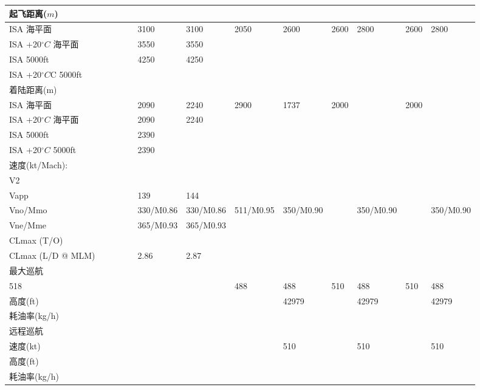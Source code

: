 \documentclass[12pt,a4paper]{report}
\begin{document}
\begin{landscape}
\begin{center}
\begin{longtable}{|p{1.5cm}|p{1.3cm}|p{1.1cm}|p{1.1cm}|p{1.1cm}|p{1.1cm}|p{1.1cm}|p{1.1cm}|p{1.1cm}|p{1.1cm}|p{1.1cm}|p{1.1cm}|p{1.1cm}|}
起飞距离($m$)	&		&		&		&		&		&		&		&		&		&		&		&		\\ \hline
ISA 海平面	&		&		&		&		&	3100	&	3100	&	2050	&	2600	&	2600	&	2800	&	2600	&	2800	\\ \hline
ISA +20$^\circ C$ 海平面	&		&		&		&		&	3550	&	3550	&		&		&		&		&		&		\\ \hline
ISA 5000ft	&		&		&		&		&	4250	&	4250	&		&		&		&		&		&		\\ \hline
ISA +20$^\circ C$C 5000ft	&		&		&		&		&		&		&		&		&		&		&		&		\\ \hline
着陆距离(m)	&		&		&		&		&		&		&		&		&		&		&		&		\\ \hline
ISA 海平面	&		&		&		&		&	2090	&	2240	&	2900	&	1737	&	2000	&		&	2000	&		\\ \hline
ISA +20$^\circ C$ 海平面	&		&		&		&		&	2090	&	2240	&		&		&		&		&		&		\\ \hline
ISA 5000ft	&		&		&		&		&	2390	&		&		&		&		&		&		&		\\ \hline
ISA +20$^\circ C$ 5000ft	&		&		&		&		&	2390	&		&		&		&		&		&		&		\\ \hline
速度(kt/Mach):	&		&		&		&		&		&		&		&		&		&		&		&		\\ \hline
V2	&		&		&		&		&		&		&		&		&		&		&		&		\\ \hline
Vapp	&		&		&		&		&	139	&	144	&		&		&		&		&		&		\\ \hline
Vno/Mmo	&		&		&		&		&	330/M0.86	&	330/M0.86	&	511/M0.95	&	350/M0.90	&		&	350/M0.90	&		&	350/M0.90	\\ \hline
Vne/Mme	&		&		&		&		&	365/M0.93	&	365/M0.93	&		&		&		&		&		&		\\ \hline
CLmax (T/O)	&		&		&		&		&		&		&		&		&		&		&		&		\\ \hline
CLmax (L/D @ MLM)	&		&		&		&		&	2.86	&	2.87	&		&		&		&		&		&		\\ \hline
最大巡航	&		&		&		&		&		&		&		&		&		&		&		&		\\ \hline
518	&		&		&		&		&		&		&	488	&	488	&	510	&	488	&	510	&	488	\\ \hline
高度(ft)	&		&		&		&		&		&		&		&	42979	&		&	42979	&		&	42979	\\ \hline
耗油率(kg/h)	&		&		&		&		&		&		&		&		&		&		&		&		\\ \hline
远程巡航	&		&		&		&		&		&		&		&		&		&		&		&		\\ \hline
速度(kt)	&		&		&		&		&		&		&		&	510	&		&	510	&		&	510	\\ \hline
高度(ft)	&		&		&		&		&		&		&		&		&		&		&		&		\\ \hline
耗油率(kg/h)	&		&		&		&		&		&		&		&		&		&		&		&		\\ \hline

\end{longtable}
\end{center}
\end{landscape}
\end{document}
